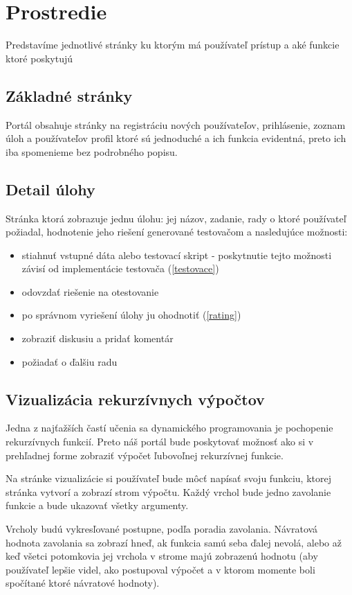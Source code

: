 \section{Prostredie}
Predstavíme jednotlivé stránky ku ktorým má používateľ prístup a aké
funkcie ktoré poskytujú

\subsection{Základné stránky}
Portál obsahuje stránky na registráciu nových používateľov, prihlásenie, zoznam úloh a
používateľov profil ktoré sú jednoduché a ich funkcia evidentná, preto ich iba spomenieme
bez podrobného popisu.

\subsection{Detail úlohy}
Stránka ktorá zobrazuje jednu úlohu: jej názov, zadanie, rady o ktoré používateľ požiadal, hodnotenie jeho riešení
generované testovačom a nasledujúce možnosti:
\begin{itemize}
  \item stiahnuť vstupné dáta alebo testovací skript - poskytnutie tejto možnosti závisí od implementácie testovača (\ref{testovace})
  \item odovzdať riešenie na otestovanie
  \item po správnom vyriešení úlohy ju ohodnotiť (\ref{rating})
  \item zobraziť diskusiu a pridať komentár
  \item požiadať o ďalšiu radu
\end{itemize}

\subsection{Vizualizácia rekurzívnych výpočtov}
Jedna z najťažších častí učenia sa dynamického programovania je pochopenie rekurzívnych funkcií.
Preto náš portál bude poskytovať možnosť ako si v prehľadnej forme zobraziť výpočet ľubovoľnej
rekurzívnej funkcie.

Na stránke vizualizácie si používateľ bude môcť napísať svoju funkciu, ktorej stránka vytvorí
a zobrazí strom výpočtu. Každý vrchol bude jedno zavolanie funkcie a bude ukazovať všetky argumenty.

Vrcholy budú vykresľované postupne, podľa poradia zavolania. Návratová hodnota zavolania
sa zobrazí hneď, ak funkcia samú seba ďalej nevolá, alebo až keď všetci potomkovia jej vrchola v strome
majú zobrazenú hodnotu (aby používateľ lepšie videl, ako postupoval výpočet a v ktorom momente
boli spočítané ktoré návratové hodnoty).

